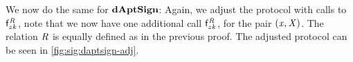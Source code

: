 We now do the same for $\mathbf{dAptSign}$:
Again, we adjust the protocol with calls to $\mathsf{f}^{\mathit{R}}_{zk}$, note that we now have one additional call $\mathsf{f}^{\mathit{R}}_{zk}$, for the pair $(\mathit{x}, \mathit{X})$.
The relation $\mathit{R}$ is equally defined as in the previous proof.
The adjusted protocol can be seen in \cref{fig:sig:daptsign-adj}.
\begin{figure}
    \begin{center}
\end{center}
\end{figure}
